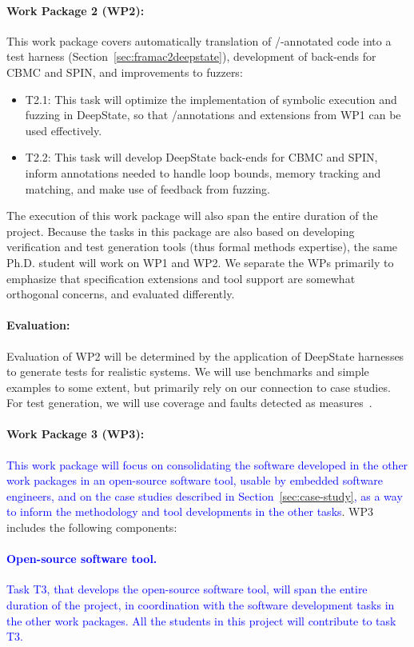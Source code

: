 \paragraph{Work Package 2 (WP2):}  This work package covers
automatically translation of \acsl/\eacsl-annotated code 
into a \deepstate test harness (Section~\ref{sec:framac2deepstate}),
development of back-ends for CBMC and SPIN, and
improvements to fuzzers:
\begin{itemize}[labelsep=3pt,leftmargin=12pt]
\item T2.1: This task will optimize the implementation of symbolic
  execution and fuzzing in DeepState, so that \acsl/\eacsl annotations
  and extensions from WP1 can be used effectively.
\item T2.2: This task will develop DeepState back-ends for CBMC and
  SPIN, inform annotations needed to handle loop bounds,
  memory tracking and matching, and make use of feedback from fuzzing.
\end{itemize}

The execution of this work package will also span the entire duration of the project.
Because the tasks in this package are also based on developing
verification and test generation tools (thus formal methods
expertise), the same Ph.D. student will work on WP1 and WP2.  We
separate the WPs primarily to emphasize that specification extensions
and tool support are somewhat orthogonal concerns, and evaluated differently.

\paragraph{Evaluation:} Evaluation of
WP2 will be determined by the application
of DeepState harnesses to generate tests for realistic
systems.  We will use benchmarks and simple examples to some
extent, but primarily rely on our connection to case studies.
For test generation, we will use coverage and faults
detected as measures~\cite{FuzzerHicks}.  

\paragraph{Work Package 3 (WP3):}
\textcolor{blue}{%
This work package will focus on consolidating the software developed in the other work packages in an open-source software tool, usable by embedded software engineers, and on the case studies described in Section~\ref{sec:case-study}, as a way to inform the methodology and tool developments in the other tasks}.
WP3 includes the following components:
\textcolor{blue}{%
\paragraph{Open-source software tool.}
Task T3, that develops the open-source software tool, will span the entire duration of the project, in coordination with the software development tasks in the other work packages.  All the students in this project will contribute to task T3.}

